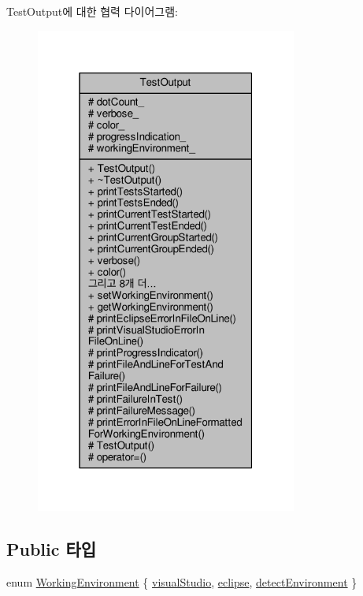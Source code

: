 Test\+Output에 대한 협력 다이어그램\+:
\nopagebreak
\begin{figure}[H]
\begin{center}
\leavevmode
\includegraphics[width=244pt]{class_test_output__coll__graph}
\end{center}
\end{figure}
\subsection*{Public 타입}
\begin{DoxyCompactItemize}
\item 
enum \hyperlink{class_test_output_a0541851f863713454486a9fb3080f766}{Working\+Environment} \{ \hyperlink{class_test_output_a0541851f863713454486a9fb3080f766a47f3a5b9ed4237588024b983a4ca8399}{visual\+Studio}, 
\hyperlink{class_test_output_a0541851f863713454486a9fb3080f766abf6505364f680c2682d5648cd0c76f53}{eclipse}, 
\hyperlink{class_test_output_a0541851f863713454486a9fb3080f766a3f11f791db94db142e33c3c75442ed10}{detect\+Environment}
 \}
\end{DoxyCompactItemize}
